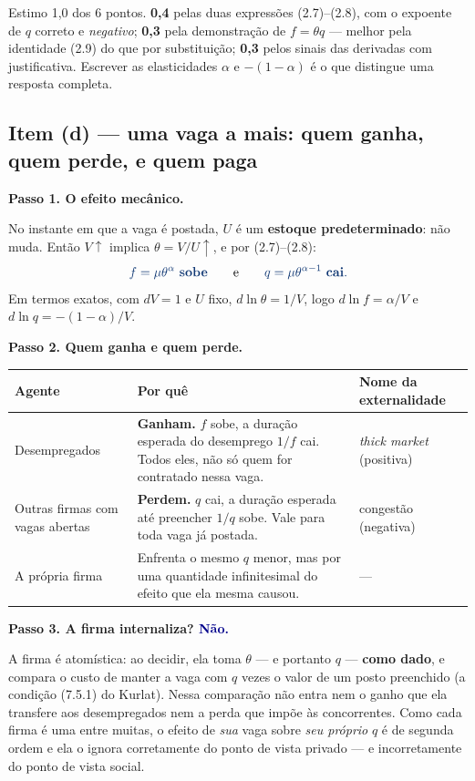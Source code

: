 \documentclass[11pt, a4paper]{article}
\newcommand{\passo}[1]{\medskip\noindent\textbf{#1}\par\nobreak}
\newcommand{\resp}[1]{%
  \ifmmode {\color{darkblue}#1}\else\textcolor{darkblue}{\textbf{#1}}\fi}
\begin{document}
\begin{tcolorbox}[rubricbox]
\small
Estimo 1,0 dos 6 pontos. \textbf{0,4} pelas duas expressões (2.7)--(2.8), com o expoente
de $q$ correto e \emph{negativo}; \textbf{0,3} pela demonstração de $f=\theta q$ ---
melhor pela identidade (2.9) do que por substituição; \textbf{0,3} pelos sinais das
derivadas com justificativa. Escrever as elasticidades $\alpha$ e $-(1-\alpha)$ é o que
distingue uma resposta completa.
\end{tcolorbox}

\subsection*{Item (d) --- uma vaga a mais: quem ganha, quem perde, e quem paga}

\passo{Passo 1. O efeito mecânico.}
No instante em que a vaga é postada, $U$ é um \textbf{estoque predeterminado}: não muda.
Então $V\uparrow$ implica $\theta = V/U \uparrow$, e por (2.7)--(2.8):
\[
\resp{f = \mu\theta^{\alpha} \ \textbf{sobe}}
\qquad\text{e}\qquad
\resp{q = \mu\theta^{\alpha-1} \ \textbf{cai} .}
\]
Em termos exatos, com $dV = 1$ e $U$ fixo, $d\ln\theta = 1/V$, logo
$d\ln f = \alpha/V$ e $d\ln q = -(1-\alpha)/V$.

\passo{Passo 2. Quem ganha e quem perde.}
\begin{center}
\small
\renewcommand{\arraystretch}{1.3}
\begin{tabular}{@{}lp{5.6cm}l@{}}
\toprule
\textbf{Agente} & \textbf{Por quê} & \textbf{Nome da externalidade} \\
\midrule
Desempregados & \textbf{Ganham.} $f$ sobe, a duração esperada do desemprego $1/f$ cai.
  Todos eles, não só quem for contratado nessa vaga. & \emph{thick market} (positiva) \\
Outras firmas com vagas abertas & \textbf{Perdem.} $q$ cai, a duração esperada até
  preencher $1/q$ sobe. Vale para toda vaga já postada. & congestão (negativa) \\
A própria firma & Enfrenta o mesmo $q$ menor, mas por uma quantidade infinitesimal do
  efeito que ela mesma causou. & --- \\
\bottomrule
\end{tabular}
\end{center}

\passo{Passo 3. A firma internaliza? \resp{Não.}}
A firma é atomística: ao decidir, ela toma $\theta$ --- e portanto $q$ --- \textbf{como
dado}, e compara o custo de manter a vaga com $q$ vezes o valor de um posto preenchido
(a condição (7.5.1) do Kurlat). Nessa comparação não entra nem o ganho que ela transfere
aos desempregados nem a perda que impõe às concorrentes. Como cada firma é uma entre
muitas, o efeito de \emph{sua} vaga sobre \emph{seu próprio} $q$ é de segunda ordem e ela
o ignora corretamente do ponto de vista privado --- e incorretamente do ponto de vista
social.
\end{document}
